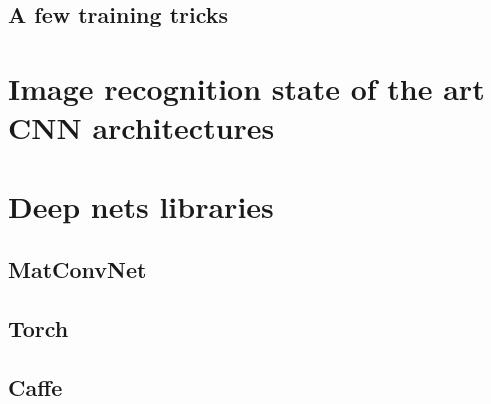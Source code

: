 \documentclass{report}
\begin{document}
\section{A few training tricks}



\chapter{Image recognition state of the art CNN architectures}




\chapter{Deep nets libraries}
\label{lib}

\section{MatConvNet}


\section{Torch}


\section{Caffe}










	


\end{document}
